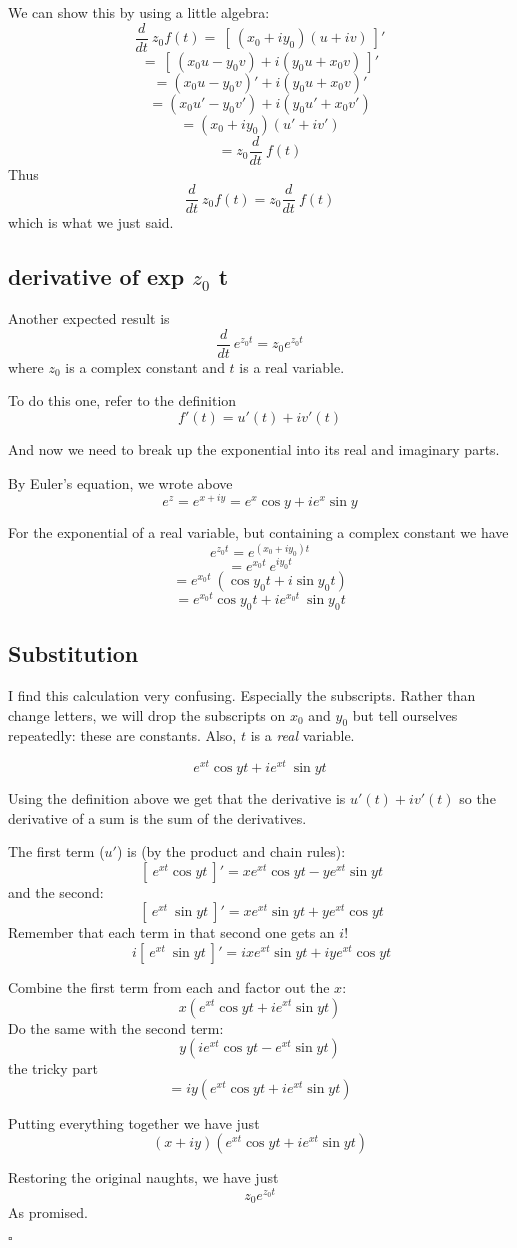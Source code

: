 \documentclass[11pt, oneside]{article}
\begin{document}
We can show this by using a little algebra:
\[ \frac{d}{dt} \ z_0 f(t) = \ [ \ (x_0 + i y_0) (u + iv) \ ]' \]
\[ = \ [ \ (x_0 u - y_0 v) + i (y_0 u + x_0 v) \ ]' \]
\[ = (x_0 u - y_0 v)' + i (y_0 u + x_0 v)' \]
\[ = (x_0 u' - y_0 v') + i (y_0 u' + x_0 v') \]
\[ = (x_0 + i y_0)(u' + iv') \]
\[ = z_0 \frac{d}{dt} \ f(t) \]
Thus
\[ \frac{d}{dt} \ z_0 f(t) = z_0 \frac{d}{dt} \ f(t) \]
which is what we just said.

\subsection*{derivative of exp $z_0$ t }

Another expected result is
\[ \frac{d}{dt} \ e^{z_0 t} = z_0 e^{z_0 t} \]
where $z_0$ is a complex constant and $t$ is a real variable.

To do this one, refer to the definition
\[ f'(t) = u'(t) + i v'(t) \]

And now we need to break up the exponential into its real and imaginary parts.  

By Euler's equation, we wrote above
\[ e^z = e^{x + iy} = e^x \cos y + i e^x \sin y \]

For the exponential of a real variable, but containing a complex constant we have
\[ e^{z_0 t} = e^{(x_0 + iy_0) t} \]
\[ = e^{x_0t} \ e^{i y_0 t} \]
\[ = e^{x_0t} \ (\cos y_0 t + i \sin y_0 t) \]
\[ = e^{x_0t} \cos y_0 t + i e^{x_0t} \ \sin y_0 t \]

\subsection*{Substitution}

I find this calculation very confusing.  Especially the subscripts.  Rather than change letters, we will drop the subscripts on $x_0$ and $y_0$ but tell ourselves repeatedly:  these are constants.  Also, $t$ is a \emph{real} variable.

\[ e^{xt} \cos y t + i e^{xt} \ \sin yt \]

Using the definition above we get that the derivative is $u'(t) + i v'(t)$ so the derivative of a sum is the sum of the derivatives.

The first term ($u'$) is (by the product and chain rules):
\[ \ [ \ e^{xt} \cos y t \ ]' = x e^{xt} \cos yt  - y e^{xt} \sin yt \]
and the second:
\[ \ [ \ e^{xt} \ \sin yt \ ]' =  x e^{xt} \sin yt  + y e^{xt} \cos yt \]
Remember that each term in that second one gets an $i$!
\[ \ i[ \ e^{xt} \ \sin yt \ ]' =  ix e^{xt} \sin yt  + iy e^{xt} \cos yt \]

Combine the first term from each and factor out the $x$:
\[ x(e^{xt} \cos yt +  ie^{xt} \sin yt) \]
Do the same with the second term:
\[ y(ie^{xt} \cos yt - e^{xt} \sin yt) \]
the tricky part
\[ = iy(e^{xt} \cos yt + ie^{xt} \sin yt) \]

Putting everything together we have just
\[ (x + iy)(e^{xt} \cos yt + ie^{xt} \sin yt) \]

Restoring the original naughts, we have just
\[ z_0 e^{z_0 t} \]
As promised.

$\square$
\end{document}
